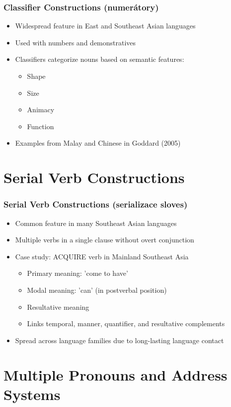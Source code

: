 \documentclass{beamer}
\begin{document}
\begin{frame}
\frametitle{Classifier Constructions (numerátory)}
\begin{itemize}
\item Widespread feature in East and Southeast Asian languages
\item Used with numbers and demonstratives
\item Classifiers categorize nouns based on semantic features:
  \begin{itemize}
  \item Shape
  \item Size
  \item Animacy
  \item Function
  \end{itemize}
\item Examples from Malay and Chinese in Goddard (2005)
\end{itemize}
\end{frame}

\section{Serial Verb Constructions}

\begin{frame}
\frametitle{Serial Verb Constructions (serializace sloves)}
\begin{itemize}
\item Common feature in many Southeast Asian languages
\item Multiple verbs in a single clause without overt conjunction
\item Case study: ACQUIRE verb in Mainland Southeast Asia
  \begin{itemize}
  \item Primary meaning: 'come to have'
  \item Modal meaning: 'can' (in postverbal position)
  \item Resultative meaning
  \item Links temporal, manner, quantifier, and resultative complements
  \end{itemize}
\item Spread across language families due to long-lasting language contact
\end{itemize}
\end{frame}

\section{Multiple Pronouns and Address Systems}
\end{document}

